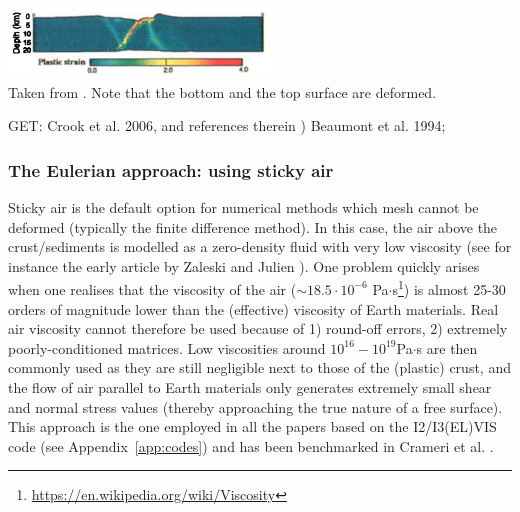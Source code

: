 \begin{center}
\includegraphics[width=7cm]{images/freesurface/labp00}\\
{\small Taken from \cite{labp00}. Note that the bottom and the top surface are deformed.}
\end{center}



GET:
Crook et al. 2006, and references therein \cite{crwy06})
Beaumont et al. 1994;  \cite{befh94}


\subsubsection{The Eulerian approach: using sticky air}

Sticky air is the default option for numerical methods which mesh 
cannot be deformed (typically the finite difference method).
In this case, the air above the crust/sediments is modelled as a zero-density fluid with 
very low viscosity (see for instance the early article by Zaleski and Julien \cite{zaju92}). 
One problem quickly arises when one realises that the viscosity of the 
air ($\sim 18.5\cdot10^{-6}$ Pa$\cdot$s\footnote{\url{https://en.wikipedia.org/wiki/Viscosity}})
is almost 25-30 orders of magnitude lower than the (effective) viscosity of Earth materials. 
Real air viscosity cannot therefore be used because of 1) round-off errors, 2) extremely 
poorly-conditioned matrices. Low viscosities around $10^{16}-10^{19}$Pa$\cdot$s are then 
commonly used as they are still negligible next to those of the (plastic) crust, and the 
flow of air parallel to Earth materials only generates extremely small shear and normal stress values
(thereby approaching the true nature of a free surface). 
This approach is the one employed in all the papers based on the I2/I3(EL)VIS code (see Appendix~\ref{app:codes})
and has been benchmarked in Crameri et al. \cite{crsg12}.

